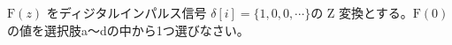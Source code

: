 $\textrm{F}(z)$ をディジタルインパルス信号 $\delta[i] = \{1,0,0,\cdots \}$の Z 変換とする。$\textrm{F}(0)$ の値を選択肢a〜dの中から1つ選びなさい。
